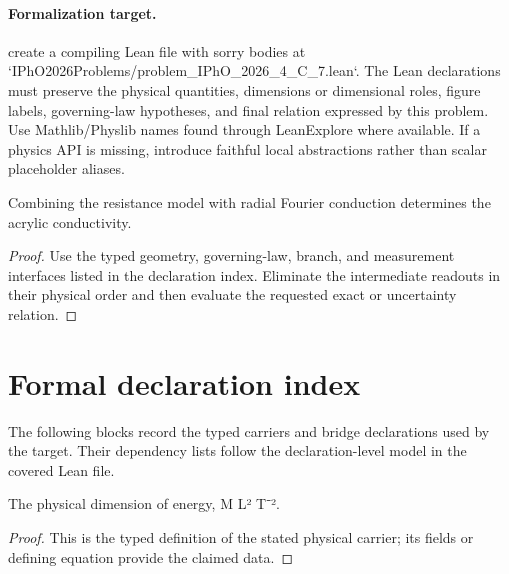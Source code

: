 \paragraph{Formalization target.}
create a compiling Lean file with sorry bodies at `IPhO2026Problems/problem\_IPhO\_2026\_4\_C\_7.lean`. The Lean declarations must preserve the physical quantities, dimensions or dimensional roles, figure labels, governing-law hypotheses, and final relation expressed by this problem.
Use Mathlib/Physlib names found through LeanExplore where available. If a physics API is missing, introduce faithful local abstractions rather than scalar placeholder aliases.

\begin{theorem}
  \label{thm:physics:IPhO_2026_4_C_7:target}
  Combining the resistance model with radial Fourier conduction determines the acrylic conductivity.
\end{theorem}
\begin{proof}
  Use the typed geometry, governing-law, branch, and measurement interfaces listed in the declaration index.  Eliminate the intermediate readouts in their physical order and then evaluate the requested exact or uncertainty relation.
\end{proof}
\section*{Formal declaration index}
The following blocks record the typed carriers and bridge declarations used by the target.  Their dependency lists follow the declaration-level model in the covered Lean file.

\begin{definition}
  \label{def:physics:IPhO_2026_4_C_7:aux001}
  The physical dimension of energy, M L² T⁻².
\end{definition}
\begin{proof}
  This is the typed definition of the stated physical carrier; its fields or defining equation provide the claimed data.
\end{proof}

